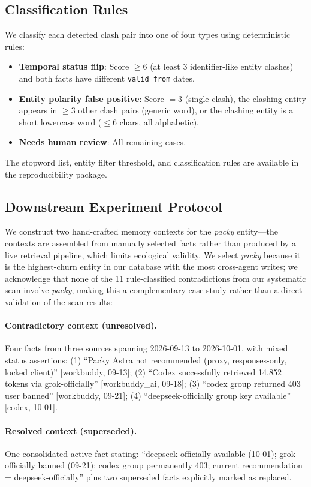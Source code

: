 \documentclass{article}
\begin{document}
\subsection{Classification Rules}
We classify each detected clash pair into one of four types using deterministic rules:
\begin{itemize}
\item \textbf{Temporal status flip}: Score $\geq 6$ (at least 3 identifier-like entity clashes) and both facts have different \texttt{valid\_from} dates.
\item \textbf{Entity polarity false positive}: Score $= 3$ (single clash), the clashing entity appears in $\geq 3$ other clash pairs (generic word), or the clashing entity is a short lowercase word ($\leq 6$ chars, all alphabetic).
\item \textbf{Needs human review}: All remaining cases.
\end{itemize}

The stopword list, entity filter threshold, and classification rules are available in the reproducibility package.

\subsection{Downstream Experiment Protocol}
We construct two hand-crafted memory contexts for the \emph{packy} entity---the contexts are assembled from manually selected facts rather than produced by a live retrieval pipeline, which limits ecological validity. We select \emph{packy} because it is the highest-churn entity in our database with the most cross-agent writes; we acknowledge that none of the 11 rule-classified contradictions from our systematic scan involve \emph{packy}, making this a complementary case study rather than a direct validation of the scan results:

\paragraph{Contradictory context (unresolved).} Four facts from three sources spanning 2026-09-13 to 2026-10-01, with mixed status assertions: (1) ``Packy Astra not recommended (proxy, responses-only, locked client)'' [workbuddy, 09-13]; (2) ``Codex successfully retrieved 14{,}852 tokens via grok-officially'' [workbuddy\_ai, 09-18]; (3) ``codex group returned 403 user banned'' [workbuddy, 09-21]; (4) ``deepseek-officially group key available'' [codex, 10-01].

\paragraph{Resolved context (superseded).} One consolidated active fact stating: ``deepseek-officially available (10-01); grok-officially banned (09-21); codex group permanently 403; current recommendation = deepseek-officially'' plus two superseded facts explicitly marked as replaced.
\end{document}
